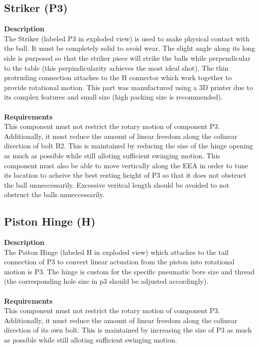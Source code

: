 \documentclass[titlepage]{article}
\begin{document}
\subsection{Striker (P3)}
\textbf{Description}\\
The Striker (labeled P3 in exploded view) is used to make physical contact with the ball. It must be completely solid to avoid wear. The slight angle along its long side is purposed so that the striker piece will strike the balls while perpendicular to the table (this perpindicularity achieves the most ideal shot). The thin protruding connection attaches to the H connector which work together to provide rotational motion. This part was manufactured using a 3D printer due to its complex features and small size (high packing size is recommended).\\~\\
\textbf{Requirements}\\
This component must not restrict the rotary motion of component P3. Additionally, it must reduce the amount of linear freedom along the colinear direction of bolt B2. This is maintained by reducing the size of the hinge opening as much as possible while still alloting sufficient swinging motion. This component must also be able to move vertically along the EEA in order to tune its location to acheive the best resting height of P3 so that it does not obstruct the ball unneccessarily. Excessive veritcal length should be avoided to not obstruct the balls unneccessarily.


\subsection{Piston Hinge (H)}
\textbf{Description}\\
The Psiton Hinge (labeled H in exploded view) which attaches to the tail connection of P3 to convert linear actuation from the piston into rotational motion is P3. The hinge is custom for the specific pneumatic bore size and thread (the corresponding hole size in p3 should be adjusted accordingly).\\~\\
\textbf{Requirements}\\
This component must not restrict the rotary motion of component P3. Additionally, it must reduce the amount of linear freedom along the colinear direction of its own bolt. This is maintained by increasing the size of P3 as much as possible while still alloting sufficient swinging motion. 
\end{document}
